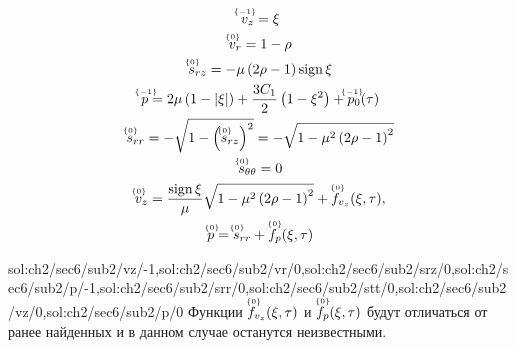 \begin{gather}
  \label{sol:ch2/sec6/sub2/vz/-1}
  \uindex{v}{-1}_{z} = \xi
  \\
  \label{sol:ch2/sec6/sub2/vr/0}
  \uindex{v}{0}_{r} =  1 - \rho
  \\
  \label{sol:ch2/sec6/sub2/srz/0}
  \uindex{s}{0}_{rz} = -\mu \left(2\rho - 1\right) \sign \xi
  \\
  \label{sol:ch2/sec6/sub2/p/-1}
  \uindex{p}{-1} = 2\mu\left(1-\lvert\xi\rvert\right) + \frac{3 C_1}{2}\left(1-\xi^2\right) + \uindex{p}{-1}_{0}(\tau)
  \\
  \label{sol:ch2/sec6/sub2/srr/0}
  \uindex{s}{0}_{rr} = -\sqrt{1-\left(\uindex{s}{0}_{rz}\right)^2} = -\sqrt{1-\mu^2\left(2\rho-1\right)^2}
  \\
  \label{sol:ch2/sec6/sub2/stt/0}
  \uindex{s}{0}_{\theta\theta} = 0
  \\
  \label{sol:ch2/sec6/sub2/vz/0}
  \uindex{v}{0}_{z} = \frac{\sign\xi}{\mu}\sqrt{1-\mu^2\left(2\rho-1\right)^2} + \uindex{f}{0}_{v_{z}}(\xi,\tau),
  \\
  \label{sol:ch2/sec6/sub2/p/0}
  \uindex{p}{0} = \uindex{s}{0}_{rr} +\uindex{f}{0}_{p}(\xi,\tau)
\end{gather}
\endgroup

\expandafter\gdef\csname sol:ch2/sec6/sub2/main/int\endcsname{sol:ch2/sec6/sub2/vz/-1,sol:ch2/sec6/sub2/vr/0,sol:ch2/sec6/sub2/srz/0,sol:ch2/sec6/sub2/p/-1,sol:ch2/sec6/sub2/srr/0,sol:ch2/sec6/sub2/stt/0,sol:ch2/sec6/sub2/vz/0,sol:ch2/sec6/sub2/p/0}
Функции $\uindex{f}{0}_{v_{z}}(\xi,\tau)$ и $\uindex{f}{0}_{p}(\xi,\tau)$ будут отличаться от ранее найденных и в данном случае останутся неизвестными.

